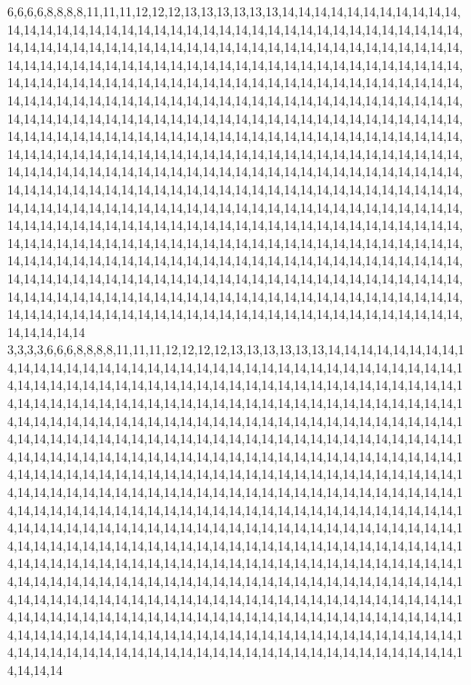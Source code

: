 6,6,6,6,8,8,8,8,11,11,11,12,12,12,13,13,13,13,13,13,14,14,14,14,14,14,14,14,14,14,14,14,14,14,14,14,14,14,14,14,14,14,14,14,14,14,14,14,14,14,14,14,14,14,14,14,14,14,14,14,14,14,14,14,14,14,14,14,14,14,14,14,14,14,14,14,14,14,14,14,14,14,14,14,14,14,14,14,14,14,14,14,14,14,14,14,14,14,14,14,14,14,14,14,14,14,14,14,14,14,14,14,14,14,14,14,14,14,14,14,14,14,14,14,14,14,14,14,14,14,14,14,14,14,14,14,14,14,14,14,14,14,14,14,14,14,14,14,14,14,14,14,14,14,14,14,14,14,14,14,14,14,14,14,14,14,14,14,14,14,14,14,14,14,14,14,14,14,14,14,14,14,14,14,14,14,14,14,14,14,14,14,14,14,14,14,14,14,14,14,14,14,14,14,14,14,14,14,14,14,14,14,14,14,14,14,14,14,14,14,14,14,14,14,14,14,14,14,14,14,14,14,14,14,14,14,14,14,14,14,14,14,14,14,14,14,14,14,14,14,14,14,14,14,14,14,14,14,14,14,14,14,14,14,14,14,14,14,14,14,14,14,14,14,14,14,14,14,14,14,14,14,14,14,14,14,14,14,14,14,14,14,14,14,14,14,14,14,14,14,14,14,14,14,14,14,14,14,14,14,14,14,14,14,14,14,14,14,14,14,14,14,14,14,14,14,14,14,14,14,14,14,14,14,14,14,14,14,14,14,14,14,14,14,14,14,14,14,14,14,14,14,14,14,14,14,14,14,14,14,14,14,14,14,14,14,14,14,14,14,14,14,14,14,14,14,14,14,14,14,14,14,14,14,14,14,14,14,14,14,14,14,14,14,14,14,14,14,14,14,14,14,14,14,14,14,14,14,14,14,14,14,14,14,14,14,14,14,14,14,14,14,14,14,14,14,14,14,14,14,14,14,14,14,14,14,14,14,14,14,14,14,14,14,14,14,14,14,14,14,14,14,14,14,14,14,14,14,14,14,14,14,14,14,14,14,14,14,14,14,14,14,14,14,14,14,14,14,14,14,14,14,14,14,14,14,14,14,14,14,14,14,14,14,14,14,14,14,14,14,14,14,14,14,14,14,14,14,14,14,14,14
3,3,3,3,6,6,6,8,8,8,8,11,11,11,12,12,12,12,13,13,13,13,13,13,14,14,14,14,14,14,14,14,14,14,14,14,14,14,14,14,14,14,14,14,14,14,14,14,14,14,14,14,14,14,14,14,14,14,14,14,14,14,14,14,14,14,14,14,14,14,14,14,14,14,14,14,14,14,14,14,14,14,14,14,14,14,14,14,14,14,14,14,14,14,14,14,14,14,14,14,14,14,14,14,14,14,14,14,14,14,14,14,14,14,14,14,14,14,14,14,14,14,14,14,14,14,14,14,14,14,14,14,14,14,14,14,14,14,14,14,14,14,14,14,14,14,14,14,14,14,14,14,14,14,14,14,14,14,14,14,14,14,14,14,14,14,14,14,14,14,14,14,14,14,14,14,14,14,14,14,14,14,14,14,14,14,14,14,14,14,14,14,14,14,14,14,14,14,14,14,14,14,14,14,14,14,14,14,14,14,14,14,14,14,14,14,14,14,14,14,14,14,14,14,14,14,14,14,14,14,14,14,14,14,14,14,14,14,14,14,14,14,14,14,14,14,14,14,14,14,14,14,14,14,14,14,14,14,14,14,14,14,14,14,14,14,14,14,14,14,14,14,14,14,14,14,14,14,14,14,14,14,14,14,14,14,14,14,14,14,14,14,14,14,14,14,14,14,14,14,14,14,14,14,14,14,14,14,14,14,14,14,14,14,14,14,14,14,14,14,14,14,14,14,14,14,14,14,14,14,14,14,14,14,14,14,14,14,14,14,14,14,14,14,14,14,14,14,14,14,14,14,14,14,14,14,14,14,14,14,14,14,14,14,14,14,14,14,14,14,14,14,14,14,14,14,14,14,14,14,14,14,14,14,14,14,14,14,14,14,14,14,14,14,14,14,14,14,14,14,14,14,14,14,14,14,14,14,14,14,14,14,14,14,14,14,14,14,14,14,14,14,14,14,14,14,14,14,14,14,14,14,14,14,14,14,14,14,14,14,14,14,14,14,14,14,14,14,14,14,14,14,14,14,14,14,14,14,14,14,14,14,14,14,14,14,14,14,14,14,14,14,14,14,14,14,14,14,14,14,14,14,14,14,14,14,14,14,14,14,14,14,14,14,14,14,14,14,14,14,14,14,14,14,14,14,14,14,14,14,14,14

